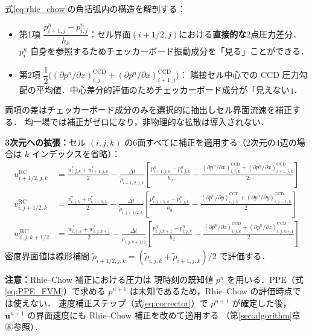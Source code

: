 \documentclass[12pt, a4paper, titlepage]{article}
\newcommand{\jp}[1]{{\normalfont\jpfont #1}}
\newcommand{\bu}{\bm{u}}
\begin{document}
\jp{式\eqref{eq:rhie_chow}の角括弧内の構造を解剖する：}
\begin{itemize}
  \item \jp{第1項 $\dfrac{p^n_{i+1,j}-p^n_{i,j}}{h_x}$：セル界面$(i+1/2,j)$における\textbf{直接的な}2点圧力差分．
       $p^n_i$ 自身を参照するためチェッカーボード振動成分を「見る」ことができる．}
  \item \jp{第2項 $\dfrac{1}{2}\bigl((\partial p^n/\partial x)^{\mathrm{CCD}}_{i,j}+(\partial p^n/\partial x)^{\mathrm{CCD}}_{i+1,j}\bigr)$：
     隣接セル中心での CCD 圧力勾配の平均値．中心差分的評価のためチェッカーボード成分が「見えない」．}
\end{itemize}
\jp{両項の差はチェッカーボード成分のみを選択的に抽出しセル界面流速を補正する．
均一場では補正がゼロになり，非物理的な拡散は導入されない．}

\jp{\textbf{3次元への拡張：}セル $(i,j,k)$ の6面すべてに補正を適用する（2次元の4辺の場合は $k$ インデックスを省略）：}
\begin{align}
  u_{i+1/2,j,k}^{\mathrm{RC}} &= \frac{u^*_{i,j,k}+u^*_{i+1,j,k}}{2}
    - \frac{\Delta t}{\tilde\rho_{i+1/2,j,k}}\!\left[\frac{p^n_{i+1,j,k}-p^n_{i,j,k}}{h_x}
      -\frac{(\partial p^n/\partial x)^{\mathrm{CCD}}_{i,j,k}+(\partial p^n/\partial x)^{\mathrm{CCD}}_{i+1,j,k}}{2}\right]\label{eq:rhie_chow_u}\\[3pt]
  v_{i,j+1/2,k}^{\mathrm{RC}} &= \frac{v^*_{i,j,k}+v^*_{i,j+1,k}}{2}
    - \frac{\Delta t}{\tilde\rho_{i,j+1/2,k}}\!\left[\frac{p^n_{i,j+1,k}-p^n_{i,j,k}}{h_y}
      -\frac{(\partial p^n/\partial y)^{\mathrm{CCD}}_{i,j,k}+(\partial p^n/\partial y)^{\mathrm{CCD}}_{i,j+1,k}}{2}\right]\label{eq:rhie_chow_v}\\[3pt]
  w_{i,j,k+1/2}^{\mathrm{RC}} &= \frac{w^*_{i,j,k}+w^*_{i,j,k+1}}{2}
    - \frac{\Delta t}{\tilde\rho_{i,j,k+1/2}}\!\left[\frac{p^n_{i,j,k+1}-p^n_{i,j,k}}{h_z}
      -\frac{(\partial p^n/\partial z)^{\mathrm{CCD}}_{i,j,k}+(\partial p^n/\partial z)^{\mathrm{CCD}}_{i,j,k+1}}{2}\right]\label{eq:rhie_chow_w}
\end{align}
\jp{密度界面値は線形補間 $\tilde\rho_{i+1/2,j,k}=(\tilde\rho_{i,j,k}+\tilde\rho_{i+1,j,k})/2$ で評価する．}

\begin{tcolorbox}[warnbox]
\jp{\textbf{注意：}Rhie--Chow 補正における圧力は
現時刻の既知値 $p^n$ を用いる．PPE（式\eqref{eq:PPE_FVM}）で求める
$p^{n+1}$ は未知であるため，Rhie--Chow の評価時点では使えない．
速度補正ステップ（式\eqref{eq:corrector}）で $p^{n+1}$ が確定した後，
$\bu^{n+1}$ の界面速度にも Rhie--Chow 補正を改めて適用する
（第\ref{sec:algorithm}章 ⑧参照）．}
\end{tcolorbox}
\end{document}
